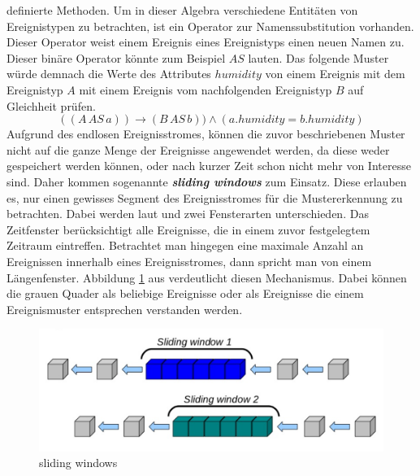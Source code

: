 \documentclass{acm_proc_article-sp}
\begin{document}
definierte Methoden. Um in dieser Algebra verschiedene Entitäten von Ereignistypen zu 
betrachten, ist ein Operator zur Namenssubstitution vorhanden. Dieser Operator weist 
einem Ereignis eines Ereignistyps einen neuen Namen zu. Dieser binäre Operator könnte zum 
Beispiel $AS$ lauten. Das folgende Muster würde demnach die Werte des Attributes 
$humidity$ von einem Ereignis mit dem Ereignistyp $A$ mit einem Ereignis vom 
nachfolgenden Ereignistyp $B$ auf Gleichheit prüfen.
$$((A\, AS\, a)) \rightarrow (B\, AS\, b)) \land (a.humidity = b.humidity)$$
Aufgrund des endlosen Ereignisstromes, können die zuvor beschriebenen Muster nicht auf 
die ganze Menge der Ereignisse angewendet werden, da diese weder gespeichert werden 
können, oder nach kurzer Zeit schon nicht mehr von Interesse sind. Daher kommen 
sogenannte \textbf{\textit{sliding windows}} zum Einsatz. Diese erlauben es, nur einen 
gewisses Segment des Ereignisstromes für die Mustererkennung zu betrachten. Dabei werden 
laut \cite{bruns} und \cite{hedtstuck} zwei Fensterarten unterschieden. Das Zeitfenster 
berücksichtigt alle Ereignisse, die in einem zuvor festgelegtem Zeitraum eintreffen. 
Betrachtet man hingegen eine maximale Anzahl an Ereignissen innerhalb eines 
Ereignisstromes, dann spricht man von einem Längenfenster. Abbildung 
\ref{img:sliding-windows} aus \cite{drools-slide} verdeutlicht diesen Mechanismus. Dabei 
können die grauen Quader als beliebige Ereignisse oder als Ereignisse die einem 
Ereignismuster entsprechen verstanden werden.

\begin{figure}[H]
    \centering
    \includegraphics[width=\linewidth]{img/sliding-windows.png}
    \caption{sliding windows}
    \label{img:sliding-windows}
\end{figure}
\end{document}
